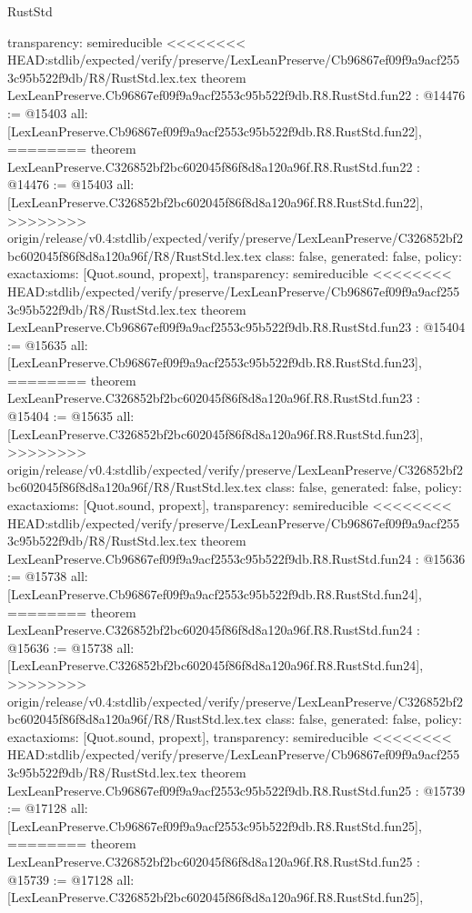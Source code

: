 \begin{lexlean}{RustStd}
\begin{coremodule}
{\begin{coremodule}
{{{{{{{{{{{{{{{{{{{{{{{{{  transparency: semireducible
}
<<<<<<<< HEAD:stdlib/expected/verify/preserve/LexLeanPreserve/Cb96867ef09f9a9acf2553c95b522f9db/R8/RustStd.lex.tex
theorem LexLeanPreserve.Cb96867ef09f9a9acf2553c95b522f9db.R8.RustStd.fun22 : @14476 := @15403 {
  all: [LexLeanPreserve.Cb96867ef09f9a9acf2553c95b522f9db.R8.RustStd.fun22],
========
theorem LexLeanPreserve.C326852bf2bc602045f86f8d8a120a96f.R8.RustStd.fun22 : @14476 := @15403 {
  all: [LexLeanPreserve.C326852bf2bc602045f86f8d8a120a96f.R8.RustStd.fun22],
>>>>>>>> origin/release/v0.4:stdlib/expected/verify/preserve/LexLeanPreserve/C326852bf2bc602045f86f8d8a120a96f/R8/RustStd.lex.tex
  class: false,
  generated: false,
  policy: exact{axioms: [Quot.sound, propext]},
  transparency: semireducible
}
<<<<<<<< HEAD:stdlib/expected/verify/preserve/LexLeanPreserve/Cb96867ef09f9a9acf2553c95b522f9db/R8/RustStd.lex.tex
theorem LexLeanPreserve.Cb96867ef09f9a9acf2553c95b522f9db.R8.RustStd.fun23 : @15404 := @15635 {
  all: [LexLeanPreserve.Cb96867ef09f9a9acf2553c95b522f9db.R8.RustStd.fun23],
========
theorem LexLeanPreserve.C326852bf2bc602045f86f8d8a120a96f.R8.RustStd.fun23 : @15404 := @15635 {
  all: [LexLeanPreserve.C326852bf2bc602045f86f8d8a120a96f.R8.RustStd.fun23],
>>>>>>>> origin/release/v0.4:stdlib/expected/verify/preserve/LexLeanPreserve/C326852bf2bc602045f86f8d8a120a96f/R8/RustStd.lex.tex
  class: false,
  generated: false,
  policy: exact{axioms: [Quot.sound, propext]},
  transparency: semireducible
}
<<<<<<<< HEAD:stdlib/expected/verify/preserve/LexLeanPreserve/Cb96867ef09f9a9acf2553c95b522f9db/R8/RustStd.lex.tex
theorem LexLeanPreserve.Cb96867ef09f9a9acf2553c95b522f9db.R8.RustStd.fun24 : @15636 := @15738 {
  all: [LexLeanPreserve.Cb96867ef09f9a9acf2553c95b522f9db.R8.RustStd.fun24],
========
theorem LexLeanPreserve.C326852bf2bc602045f86f8d8a120a96f.R8.RustStd.fun24 : @15636 := @15738 {
  all: [LexLeanPreserve.C326852bf2bc602045f86f8d8a120a96f.R8.RustStd.fun24],
>>>>>>>> origin/release/v0.4:stdlib/expected/verify/preserve/LexLeanPreserve/C326852bf2bc602045f86f8d8a120a96f/R8/RustStd.lex.tex
  class: false,
  generated: false,
  policy: exact{axioms: [Quot.sound, propext]},
  transparency: semireducible
}
<<<<<<<< HEAD:stdlib/expected/verify/preserve/LexLeanPreserve/Cb96867ef09f9a9acf2553c95b522f9db/R8/RustStd.lex.tex
theorem LexLeanPreserve.Cb96867ef09f9a9acf2553c95b522f9db.R8.RustStd.fun25 : @15739 := @17128 {
  all: [LexLeanPreserve.Cb96867ef09f9a9acf2553c95b522f9db.R8.RustStd.fun25],
========
theorem LexLeanPreserve.C326852bf2bc602045f86f8d8a120a96f.R8.RustStd.fun25 : @15739 := @17128 {
  all: [LexLeanPreserve.C326852bf2bc602045f86f8d8a120a96f.R8.RustStd.fun25],
}}}}}}}}}}}}}}}}}}}}}}}}}}}}}
\end{coremodule}}
\end{coremodule}
\end{lexlean}
